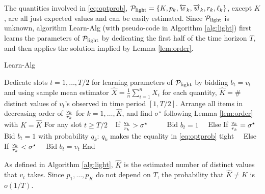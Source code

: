 The quantities involved in \eqref{eq:optprob},
$\mathcal{P}_{\text{light}} =\{K, p_k, \overleftarrow{w}_k, \overrightarrow{w}_k, r_k, \ell_k\}$, except $K$, are all just expected values and can be easily estimated.
Since $\mathcal{P}_{\text{light}}$ is unknown, algorithm \textsf{Learn-Alg} (with pseudo-code in Algorithm \ref{alg:light}) first learns the parameters of $\mathcal{P}_{\text{light}}$ by dedicating the first half of the time horizon $T$, and then applies the solution implied by Lemma \ref{lem:order}.   

\begin{algorithm}
\caption{\textsf{Learn-Alg}}\label{alg:light}
\begin{algorithmic}[1]
\State Dedicate slots $t=1, \dots, T/2$ for learning parameters of $\mathcal{P}_{\text{light}}$ by bidding $b_t=v_t$ and using sample mean estimator ${\hat X}=\frac{1}{n}\sum_{i=1}^n X_i$ for each quantity, ${\hat K} = \#$ distinct values of $v_t$'s observed in time period $[1,T/2]$.
\State Arrange all items in decreasing order of $\frac{ {\mathsf{v}}_k}{r_k} $ for $k=1,\dots, {\hat K}$, and  find $\sigma^\star$ following Lemma \ref{lem:order} with $K={\hat K}$
\State For any slot $t\ge T/2$
\State $\ \ $ If $\frac{ {\mathsf{v}}_k}{r_k} > \sigma^\star \quad\quad\  $ Bid $b_t = 1$ 
\State $\quad$Else If $\frac{ {\mathsf{v}}_k}{r_k} = \sigma^\star$ Bid $b_t = 1$ with probability $q_k$:  $q_k$ makes the equality in \eqref{eq:optprob} tight
\State $\quad$Else If $\frac{ {\mathsf{v}}_k}{r_k} < \sigma^\star \quad$ Bid $b_t = v_t$ 
\State End
\end{algorithmic}
\end{algorithm}
\vspace{-0.2in}
\begin{rem}
As defined in Algorithm \ref{alg:light}, ${\hat K}$ is the estimated number of distinct values 
that $v_t$ takes.
Since $p_1, \dots, p_K$ do not depend on $T$, the probability that ${\hat K}\ne K$ is $o(1/T)$. %
\end{rem}

